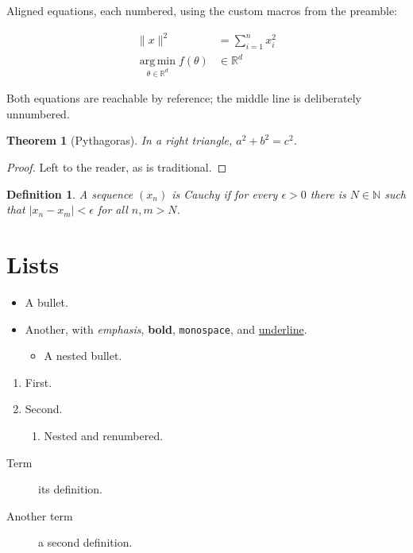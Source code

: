 \documentclass[11pt,a4paper]{article}
\newtheorem{theorem}{Theorem}
\newtheorem{definition}{Definition}
\newcommand{\normvec}[1]{\lVert #1 \rVert}
\begin{document}
Aligned equations, each numbered, using the custom macros from the preamble:

\begin{align}
\normvec{x}^2 & =\sum_{i=1}^{n}x_{i}^2 \label{eq:norm} \\
\operatorname*{\mathrm{arg\,min}}_{\theta\in\mathbb{R}^{d}}f(\theta) & \in\mathbb{R}^{d} \label{eq:argmin}
\end{align}

Both equations are reachable by reference; the middle line is deliberately unnumbered.

\begin{theorem}[Pythagoras]
	\label{thm:pythagoras}
	In a right triangle, $a^2 + b^2 = c^2$.
\end{theorem}

\begin{proof}
	Left to the reader, as is traditional.
\end{proof}

\begin{definition}
	\label{def:cauchy}
	A sequence $(x_n)$ is Cauchy if for every $\epsilon > 0$ there is $N \in \mathbb{N}$ such that
	$|x_n - x_m| < \epsilon$ for all $n, m > N$.
\end{definition}

\section{Lists}
\label{sec:lists}

\begin{itemize}
	\item A bullet.
	\item Another, with \emph{emphasis}, \textbf{bold}, \texttt{monospace}, and
	      \underline{underline}.
	\begin{itemize}
		\item A nested bullet.
	\end{itemize}
\end{itemize}

\begin{enumerate}
	\item First.
	\item Second.
	\begin{enumerate}
		\item Nested and renumbered.
	\end{enumerate}
\end{enumerate}

\begin{description}
	\item[Term] its definition.
	\item[Another term] a second definition.
\end{description}
\end{document}
